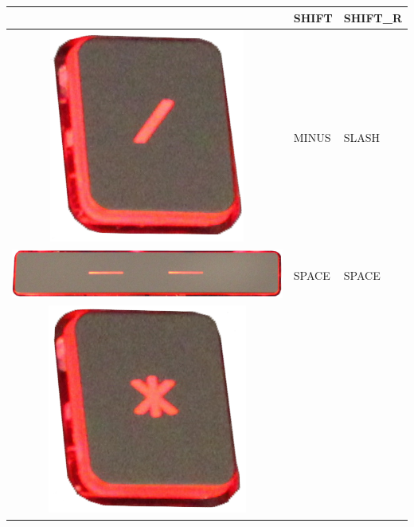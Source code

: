 \begin{longtable}{|cll|}
\begin{minipage}[c]{.4\textwidth}
\vspace{0.2cm}
\end{minipage} & SHIFT & SHIFT\_R\\
\hline
\begin{minipage}[c]{.4\textwidth}
\vspace{0.2cm}
\includegraphics[scale=0.08]{Images/KeyMapping/SLASH}
\vspace{0.2cm}
\end{minipage} & MINUS & SLASH\\
\hline
\begin{minipage}[c]{.4\textwidth}
\vspace{0.2cm}
\includegraphics[scale=0.08]{Images/KeyMapping/SPACE}
\vspace{0.2cm}
\end{minipage} & SPACE & SPACE\\
\hline
\begin{minipage}[c]{.4\textwidth}
\vspace{0.2cm}
\includegraphics[scale=0.08]{Images/KeyMapping/STAR}

\end{minipage}
\end{longtable}
